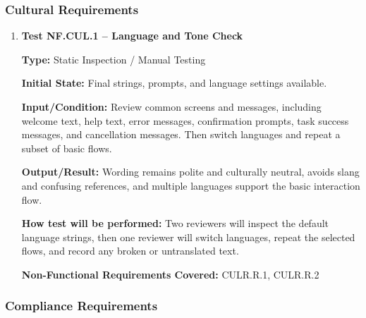 \documentclass[12pt, titlepage]{article}
\begin{document}
\subsubsection{Cultural Requirements}

\begin{enumerate}

\item \textbf{Test NF.CUL.1 -- Language and Tone Check}

\textbf{Type:} Static Inspection / Manual Testing

\textbf{Initial State:} Final strings, prompts, and language settings
available.

\textbf{Input/Condition:} Review common screens and messages, including
welcome text, help text, error messages, confirmation prompts, task
success messages, and cancellation messages. Then switch languages and
repeat a subset of basic flows.

\textbf{Output/Result:} Wording remains polite and culturally neutral,
avoids slang and confusing references, and multiple languages support
the basic interaction flow.

\textbf{How test will be performed:} Two reviewers will inspect the
default language strings, then one reviewer will switch languages,
repeat the selected flows, and record any broken or untranslated text.

\textbf{Non-Functional Requirements Covered:} CULR.R.1, CULR.R.2

\end{enumerate}

\subsubsection{Compliance Requirements}
\end{document}
